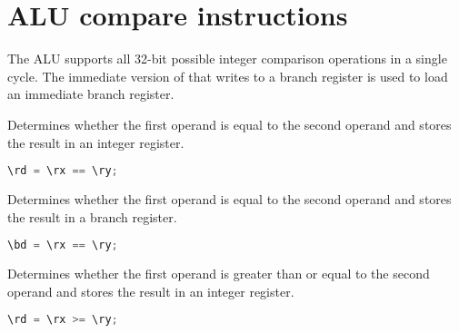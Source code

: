 
\section{ALU compare instructions}


The \rvex{} ALU supports all 32-bit possible integer comparison operations in a
single cycle. The immediate version of  that writes to a branch
register is used to load an immediate branch register.

Determines whether the first operand is equal to the second operand and stores
the result in an integer register.

\begin{lstlisting}[numbers=none, basicstyle=\ttfamily\footnotesize, language=C++]
\rd = \rx == \ry;
\end{lstlisting}

Determines whether the first operand is equal to the second operand and stores
the result in a branch register.

\begin{lstlisting}[numbers=none, basicstyle=\ttfamily\footnotesize, language=C++]
\bd = \rx == \ry;
\end{lstlisting}

Determines whether the first operand is greater than or equal to the second
operand and stores the result in an integer register.

\begin{lstlisting}[numbers=none, basicstyle=\ttfamily\footnotesize, language=C++]
\rd = \rx >= \ry;
\end{lstlisting}

